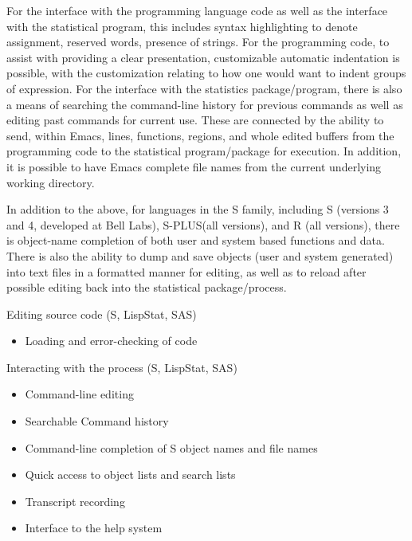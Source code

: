 \documentclass{article}
\newcommand*{\Splus}{\textsc{S-PLUS}}
\begin{document}
For the interface with the programming language code as well as the
interface with the statistical program, this includes syntax
highlighting to denote assignment, reserved words, presence of
strings.  For the programming code, to assist with providing a clear
presentation, customizable automatic indentation is possible, with the
customization relating to how one would want to indent groups of
expression.  For the interface with the statistics package/program,
there is also a means of searching the command-line history for
previous commands as well as editing past commands for current use.
These are connected by the ability to send, within Emacs, lines,
functions, regions, and whole edited buffers from the programming code
to the statistical program/package for execution.  In addition, it is
possible to have Emacs complete file names from the current underlying
working directory.

In addition to the above, for languages in the S family, including S
(versions 3 and 4, developed at Bell Labs), \Splus (all versions), and
R (all versions), there is object-name completion of both user and
system based functions and data.  There is also the ability to dump
and save objects (user and system generated) into text files in a
formatted manner for editing, as well as to reload after possible
editing back into the statistical package/process.

Editing source code (S, LispStat, SAS)
\begin{itemize}
\item Loading and error-checking of code
\end{itemize}

Interacting with the process (S, LispStat, SAS)
\begin{itemize}
\item Command-line editing
\item Searchable Command history
\item Command-line completion of S object names and file names
\item Quick access to object lists and search lists
\item Transcript recording
\item Interface to the help system
\end{itemize}
\end{document}
